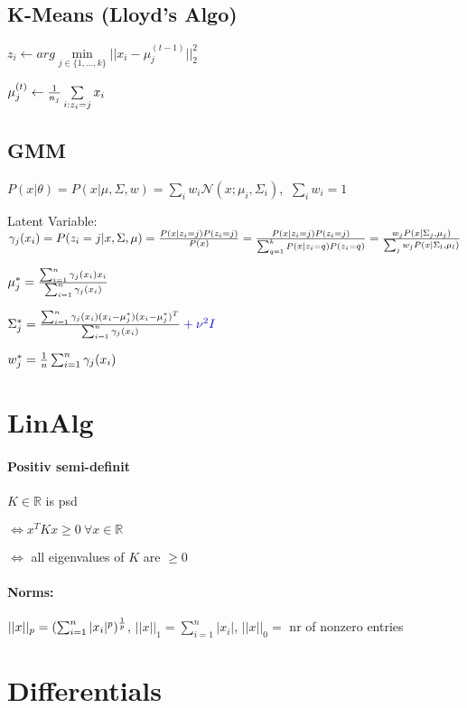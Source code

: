 \documentclass[11pt,twocolumn]{article}
\begin{document}
\subsection{K-Means (Lloyd's Algo)}

$z_i \leftarrow arg \min \limits_{j \in \lbrace 1,...,k \rbrace } || x_i - \mu_j^{(t-1)} ||_2^2 $

$ \mu_j^{(t)} \leftarrow {1 \over {n_j}} \sum \limits_{i:z_i = j} x_i$


\subsection{GMM}

$P(x|\theta) = P(x|\mu, \Sigma, w) = \sum \limits_i w_i \mathcal{N} (x;\mu_i, \Sigma_i)$, $~\sum \limits_i w_i = 1$

Latent Variable: $\gamma_j(x_i) 
= P(z_i=j|x,\Sigma, \mu) 
= { {P(x|z_i=j)P(z_i=j)} \over {P(x)}}
= { {P(x|z_i=j)P(z_i=j)} \over { \sum_{q=1}^k  P(x|z_i=q)P(z_i=q)}}
= {{w_j P(x|\Sigma_j, \mu_j)}\over{\sum_j w_j P(x|\Sigma_l , \mu_l)}}$ 


$\mu_j^* = {{\sum_{i=1}^n \gamma_j(x_i)x_i}\over{\sum_{i=1}^n \gamma_j(x_i)}} $ 

$\Sigma_j^* = {{\sum_{i=1}^n \gamma_j (x_i)(x_i - \mu_j^*)(x_i-\mu_j^*)^T}\over{\sum_{i=1}^n \gamma_j(x_i)}} \color{blue} + \nu^2 I$

$w_j^* = {1 \over {n}} \sum_{i=1}^n \gamma_j(x_i)$

\section{LinAlg}

\paragraph{Positiv semi-definit}$K \in \mathbb{R}$ is psd 

$\iff x^TKx \geq 0 ~\forall x \in \mathbb{R}$


$\iff$ all eigenvalues of $K$ are $\geq 0$


\paragraph{Norms:} $||x||_p = (\sum_{i=1}^n |x_i|^p )^{1 \over p}$, $||x||_1 = \sum_{i=1}^n |x_i|$, $||x||_0 = $ nr of nonzero entries

\section{Differentials}
\end{document}
